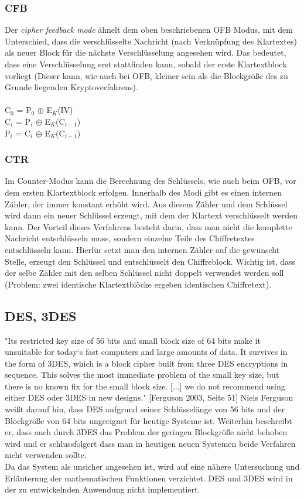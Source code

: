 \documentclass[10pt, a4paper,headsepline]{scrreprt}
\begin{document}
\subsubsection{CFB}
Der \textit{cipher feedback mode} ähnelt dem oben beschriebenen OFB Modus, mit dem Unterschied, dass die verschlüsselte Nachricht (nach Verknüpfung des Klartextes) als neuer Block für die nächste Verschlüsselung angesehen wird. Das bedeutet, dass eine Verschlüsselung erst stattfinden kann, sobald der erste Klartextblock vorliegt (Dieser kann, wie auch bei OFB, kleiner sein als die Blockgröße des zu Grunde liegenden Kryptoverfahrens). \\ \\
C$_{0}$ = P$_{0}$ $\oplus$ E$_{K}$(IV) \\
C$_{i}$ = P$_{i}$ $\oplus$ E$_{K}$(C$_{i-1}$) \\
P$_{i}$ = C$_{i}$ $\oplus$ E$_{K}$(C$_{i-1}$) \\

\subsubsection{CTR}
Im Counter-Modus kann die Berechnung des Schlüssels, wie auch beim OFB, vor dem ersten Klartextblock erfolgen. Innerhalb des Modi gibt es einen internen Zähler, der immer konstant erhöht wird. Aus diesem Zähler und dem Schlüssel wird dann ein neuer Schlüssel erzeugt, mit dem der Klartext verschlüsselt werden kann. Der Vorteil dieses Verfahrens besteht darin, dass man nicht die komplette Nachricht entschlüsseln muss, sondern einzelne Teile des Chiffretextes entschlüsseln kann. Hierfür setzt man den internen Zähler auf die gewünscht Stelle, erzeugt den Schlüssel und entschlüsselt den Chiffreblock. Wichtig ist, dass der selbe Zähler mit den selben Schlüssel nicht doppelt verwendet werden soll (Problem: zwei identische Klartextblöcke ergeben identischen Chiffretext).

\subsection{DES, 3DES}
"Its restricted key size of 56 bits and small block size of 64 bits make it unsuitable for today`s fast computers and large amounts of data. It survives in the form of 3DES, which is a block cipher built from three DES encryptions in sequence. This solves the most immediate problem of the small key size, but there is no known fix for the small block size. [...] we do not recommend using either DES oder 3DES in new designs." [Ferguson 2003, Seite 51]
Niels Ferguson weißt darauf hin, dass DES aufgrund seiner Schlüsselänge von 56 bits und der Blockgröße von 64 bits ungeeignet für heutige Systeme ist. Weiterhin beschreibt er, dass auch durch 3DES das Problem der geringen Blockgröße nicht behoben wird und er schlussfolgert dass man in heutigen neuen Systemen beide Verfahren nicht verwenden sollte. \\
Da das System als unsicher angesehen ist, wird auf eine nähere Untersuchung und Erläuterung der mathematischen Funktionen verzichtet. DES und 3DES wird in der zu entwickelnden Anwendung nicht implementiert.
\end{document}
